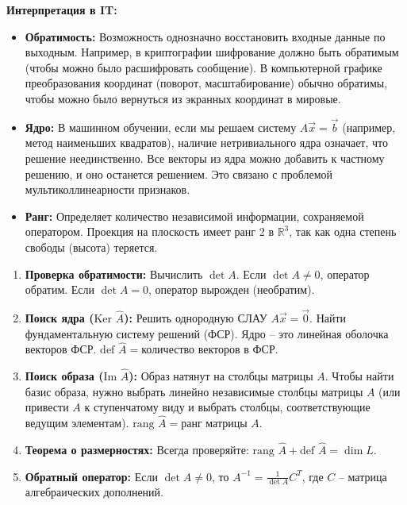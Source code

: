 \documentclass[12pt,a4paper]{article}
\theoremstyle{plain}
\theoremstyle{definition}
\begin{document}
\begin{theorybox}
    \begin{itbox}
        \textbf{Интерпретация в IT:}
        \begin{itemize}
            \item \textbf{Обратимость:} Возможность однозначно восстановить входные данные по выходным. Например, в криптографии шифрование должно быть обратимым (чтобы можно было расшифровать сообщение). В компьютерной графике преобразования координат (поворот, масштабирование) обычно обратимы, чтобы можно было вернуться из экранных координат в мировые.
            \item \textbf{Ядро:} В машинном обучении, если мы решаем систему $A\vec{x}=\vec{b}$ (например, метод наименьших квадратов), наличие нетривиального ядра означает, что решение неединственно. Все векторы из ядра можно добавить к частному решению, и оно останется решением. Это связано с проблемой мультиколлинеарности признаков.
            \item \textbf{Ранг:} Определяет количество независимой информации, сохраняемой оператором. Проекция на плоскость имеет ранг 2 в $\mathbb{R}^3$, так как одна степень свободы (высота) теряется.
        \end{itemize}
    \end{itbox}
\end{theorybox}

\vspace{0.2cm}

\begin{cheatbox}
    \begin{enumerate}[leftmargin=*, label=\arabic*.]
        \item \textbf{Проверка обратимости:} Вычислить $\det A$. Если $\det A \neq 0$, оператор обратим. Если $\det A = 0$, оператор вырожден (необратим).
        \item \textbf{Поиск ядра ($\text{Ker } \hat{A}$):} Решить однородную СЛАУ $A\vec{x} = \vec{0}$. Найти фундаментальную систему решений (ФСР). Ядро -- это линейная оболочка векторов ФСР. $\text{def } \hat{A} = \text{количество векторов в ФСР}$.
        \item \textbf{Поиск образа ($\text{Im } \hat{A}$):} Образ натянут на столбцы матрицы $A$. Чтобы найти базис образа, нужно выбрать линейно независимые столбцы матрицы $A$ (или привести $A$ к ступенчатому виду и выбрать столбцы, соответствующие ведущим элементам). $\text{rang } \hat{A} = \text{ранг матрицы } A$.
        \item \textbf{Теорема о размерностях:} Всегда проверяйте: $\text{rang } \hat{A} + \text{def } \hat{A} = \dim L$.
        \item \textbf{Обратный оператор:} Если $\det A \neq 0$, то $A^{-1} = \frac{1}{\det A} C^T$, где $C$ -- матрица алгебраических дополнений.
    \end{enumerate}
\end{cheatbox}
\end{document}
